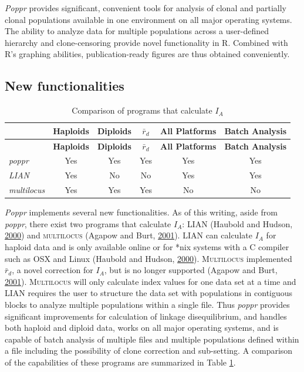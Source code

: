 \documentclass[double,12pt]{beavtex}
\begin{document}
  \emph{Poppr} provides significant, convenient tools for analysis of
  clonal and partially clonal populations available in one environment on
  all major operating systems. The ability to analyze data for multiple
  populations across a user-defined hierarchy and clone-censoring provide
  novel functionality in R. Combined with R's graphing abilities,
  publication-ready figures are thus obtained conveniently.
  
  \subsection{New functionalities}\label{new-functionalities}
  
  \begin{longtable}[]{@{}lccccc@{}}
  \caption{\label{tab:poppr5} Comparison of programs that calculate
  \(I_A\)}\tabularnewline
  \toprule
  & \textbf{Haploids} & \textbf{Diploids} & \(\bar{r}_d\) & \textbf{All
  Platforms} & \textbf{Batch Analysis}\tabularnewline
  \midrule
  \endfirsthead
  \toprule
  & \textbf{Haploids} & \textbf{Diploids} & \(\bar{r}_d\) & \textbf{All
  Platforms} & \textbf{Batch Analysis}\tabularnewline
  \midrule
  \endhead
  \emph{poppr} & Yes & Yes & Yes & Yes & Yes\tabularnewline
  \emph{LIAN} & Yes & No & No & Yes & Yes\tabularnewline
  \emph{multilocus} & Yes & Yes & Yes & No & No\tabularnewline
  \bottomrule
  \end{longtable}
  
  \emph{Poppr} implements several new functionalities. As of this writing,
  aside from \emph{poppr}, there exist two programs that calculate
  \(I_A\): \textsc{LIAN} (Haubold and Hudson,
  \protect\hyperlink{ref-Haubold:2000}{2000}) and \textsc{multilocus}
  (Agapow and Burt, \protect\hyperlink{ref-Agapow_2001}{2001}).
  \textsc{LIAN} can calculate \(I_A\) for haploid data and is only
  available online or for *nix systems with a C compiler such as OSX and
  Linux (Haubold and Hudson, \protect\hyperlink{ref-Haubold:2000}{2000}).
  \textsc{Multilocus} implemented \(\bar{r}_d\), a novel correction for
  \(I_A\), but is no longer supported (Agapow and Burt,
  \protect\hyperlink{ref-Agapow_2001}{2001}). \textsc{Multilocus} will
  only calculate index values for one data set at a time and \textsc{LIAN}
  requires the user to structure the data set with populations in
  contiguous blocks to analyze multiple populations within a single file.
  Thus \emph{poppr} provides significant improvements for calculation of
  linkage disequilibrium, and handles both haploid and diploid data, works
  on all major operating systems, and is capable of batch analysis of
  multiple files and multiple populations defined within a file including
  the possibility of clone correction and sub-setting. A comparison of the
  capabilities of these programs are summarized in Table \ref{tab:poppr5}.
  
\end{document}
